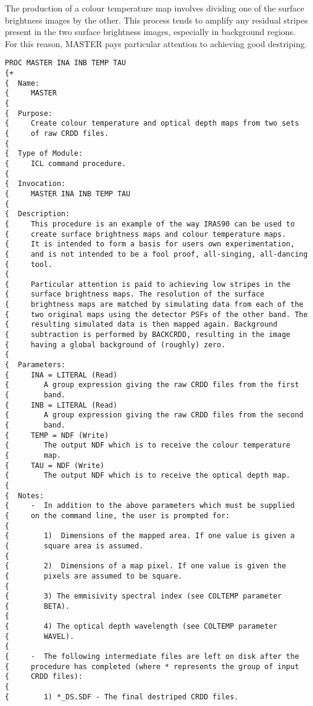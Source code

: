 The production of a colour temperature map involves dividing one of
the surface brightness images by the other. This process tends to amplify any 
residual stripes present in the two surface brightness images, especially in
background regions. For this reason, {\small MASTER} pays particular 
attention to achieving good destriping. 

\small
\begin{verbatim}
PROC MASTER INA INB TEMP TAU
{+
{  Name:
{     MASTER
{
{  Purpose:
{     Create colour temperature and optical depth maps from two sets 
{     of raw CRDD files.
{
{  Type of Module:
{     ICL command procedure.
{
{  Invocation:
{     MASTER INA INB TEMP TAU
{
{  Description:
{     This procedure is an example of the way IRAS90 can be used to 
{     create surface brightness maps and colour temperature maps. 
{     It is intended to form a basis for users own experimentation, 
{     and is not intended to be a fool proof, all-singing, all-dancing
{     tool.
{
{     Particular attention is paid to achieving low stripes in the
{     surface brightness maps. The resolution of the surface 
{     brightness maps are matched by simulating data from each of the
{     two original maps using the detector PSFs of the other band. The
{     resulting simulated data is then mapped again. Background 
{     subtraction is performed by BACKCRDD, resulting in the image 
{     having a global background of (roughly) zero.
{
{  Parameters:
{     INA = LITERAL (Read)
{        A group expression giving the raw CRDD files from the first 
{        band.
{     INB = LITERAL (Read)
{        A group expression giving the raw CRDD files from the second
{        band.
{     TEMP = NDF (Write)
{        The output NDF which is to receive the colour temperature
{        map.
{     TAU = NDF (Write)
{        The output NDF which is to receive the optical depth map.
{
{  Notes:
{     -  In addition to the above parameters which must be supplied 
{     on the command line, the user is prompted for:
{
{        1)  Dimensions of the mapped area. If one value is given a
{        square area is assumed.
{
{        2)  Dimensions of a map pixel. If one value is given the
{        pixels are assumed to be square.
{
{        3) The emmisivity spectral index (see COLTEMP parameter 
{        BETA).
{
{        4) The optical depth wavelength (see COLTEMP parameter 
{        WAVEL).
{
{     -  The following intermediate files are left on disk after the 
{     procedure has completed (where * represents the group of input 
{     CRDD files):
{
{        1) *_DS.SDF - The final destriped CRDD files.

\end{verbatim}
